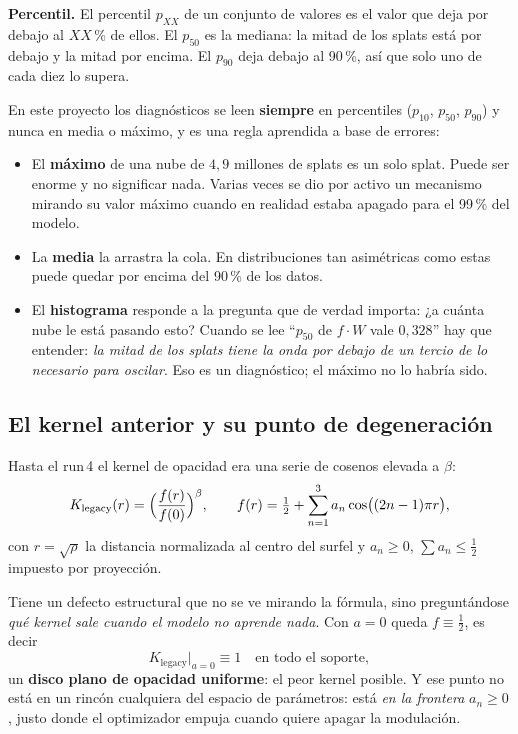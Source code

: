 \documentclass[12pt]{extarticle}
\begin{document}
\textbf{Percentil.} El percentil $p_{XX}$ de un conjunto de valores es el valor
que deja por debajo al $XX$\,\% de ellos. El $p_{50}$ es la mediana: la mitad
de los splats está por debajo y la mitad por encima. El $p_{90}$ deja debajo al
90\,\%, así que solo uno de cada diez lo supera.

En este proyecto los diagnósticos se leen \textbf{siempre} en percentiles
($p_{10}$, $p_{50}$, $p_{90}$) y nunca en media o máximo, y es una regla
aprendida a base de errores:

\begin{itemize}
\item El \textbf{máximo} de una nube de $4{,}9$ millones de splats es un solo
      splat. Puede ser enorme y no significar nada. Varias veces se dio por
      activo un mecanismo mirando su valor máximo cuando en realidad estaba
      apagado para el 99\,\% del modelo.
\item La \textbf{media} la arrastra la cola. En distribuciones tan asimétricas
      como estas puede quedar por encima del 90\,\% de los datos.
\item El \textbf{histograma} responde a la pregunta que de verdad importa:
      ¿a cuánta nube le está pasando esto? Cuando se lee ``$p_{50}$ de
      $f\!\cdot\!W$ vale $0{,}328$'' hay que entender: \emph{la mitad de los
      splats tiene la onda por debajo de un tercio de lo necesario para
      oscilar}. Eso es un diagnóstico; el máximo no lo habría sido.
\end{itemize}


\subsection{El kernel anterior y su punto de degeneración}

Hasta el run\,4 el kernel de opacidad era una serie de cosenos elevada a
$\beta$:
\[
K_{\text{legacy}}(r)=\Bigl(\frac{f(r)}{f(0)}\Bigr)^{\beta},\qquad
f(r)=\tfrac12+\sum_{n=1}^{3} a_n\cos\bigl((2n-1)\pi r\bigr),
\]
con $r=\sqrt{\rho}$ la distancia normalizada al centro del surfel y
$a_n\ge 0$, $\sum a_n\le\frac12$ impuesto por proyección.

Tiene un defecto estructural que no se ve mirando la fórmula, sino
preguntándose \emph{qué kernel sale cuando el modelo no aprende nada}. Con
$a=0$ queda $f\equiv\frac12$, es decir
\[
K_{\text{legacy}}\big|_{a=0}\equiv 1 \quad\text{en todo el soporte},
\]
un \textbf{disco plano de opacidad uniforme}: el peor kernel posible. Y ese
punto no está en un rincón cualquiera del espacio de parámetros: está
\emph{en la frontera} $a_n\ge 0$, justo donde el optimizador empuja cuando
quiere apagar la modulación.
\end{document}

